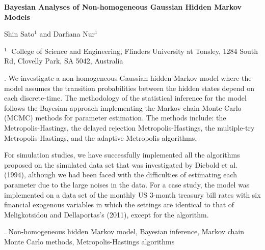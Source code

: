 \documentclass[12pt]{article}
\begin{document}
\begin{flushleft}


{\LARGE\bf Bayesian Analyses of Non-homogeneous Gaussian Hidden Markov Models}


\vspace{1.0cm}

Shin Sato$^1$ and Darfiana Nur$^1$

\begin{description}

\item $^1 \;$ College of Science and Engineering, Flinders University at Tonsley, 1284 South Rd, Clovelly Park, SA 5042, Australia

\end{description}

\end{flushleft}


\vspace{0.75cm}

. We investigate a non-homogeneous Gaussian hidden Markov model where the model assumes the transition probabilities between the hidden states depend on each discrete-time. The methodology of the statistical inference for the model follows the Bayesian approach implementing the Markov chain Monte Carlo (MCMC) methods for parameter estimation. The methods include: the Metropolis-Hastings, the delayed rejection Metropolis-Hastings, the multiple-try Metropolis-Hastings, and the adaptive Metropolis algorithms.

For simulation studies, we have successfully implemented all the algorithms proposed on the simulated data set that was investigated by Diebold et al. (1994), although we had been faced with the difficulties of estimating each parameter due to the large noises in the data. For a case study, the model was implemented on a data set of the monthly US 3-month treasury bill rates with six financial exogenous variables in which the settings are identical to that of Meligkotsidou and Dellaportas's (2011), except for the algorithm.

\vskip 2mm

.
Non-homogeneous hidden Markov model, Bayesian inference, Markov chain Monte Carlo methods, Metropolis-Hastings algorithms
\end{document}

